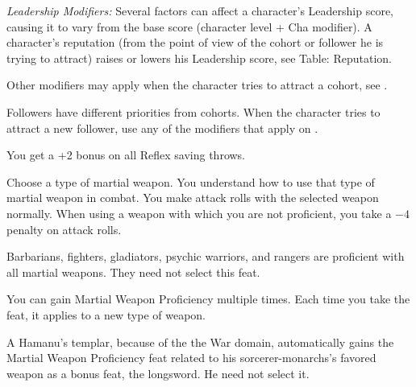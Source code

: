 {\textit{Leadership Modifiers:} Several factors can affect a character's Leadership score, causing it to vary from the base score (character level + Cha modifier). A character's reputation (from the point of view of the cohort or follower he is trying to attract) raises or lowers his Leadership score, see Table: Reputation.


Other modifiers may apply when the character tries to attract a cohort, see .


Followers have different priorities from cohorts. When the character tries to attract a new follower, use any of the modifiers that apply on .

}

{You get a +2 bonus on all Reflex saving throws.}

{Choose a type of martial weapon. You understand how to use that type of martial weapon in combat.}
{}
{You make attack rolls with the selected weapon normally.}
{When using a weapon with which you are not proficient, you take a $-4$ penalty on attack rolls.}
{Barbarians, fighters, gladiators, psychic warriors, and rangers are proficient with all martial weapons. They need not select this feat.

You can gain Martial Weapon Proficiency multiple times. Each time you take the feat, it applies to a new type of weapon.

A Hamanu's templar, because of the the War domain, automatically gains the Martial Weapon Proficiency feat related to his sorcerer-monarchs's favored weapon as a bonus feat, the longsword. He need not select it.}

